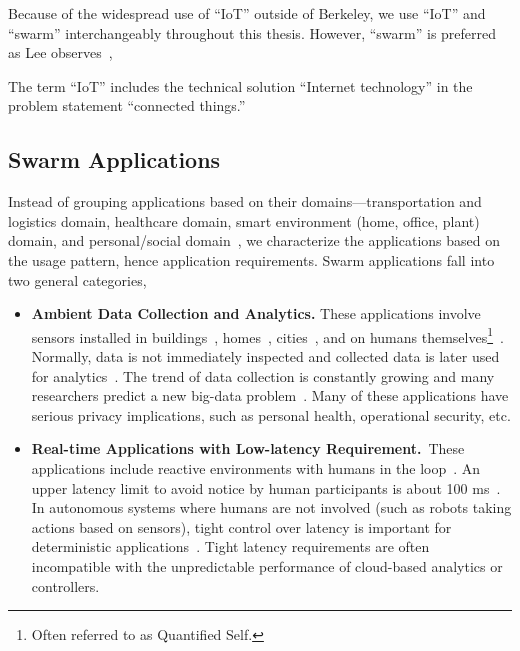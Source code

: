 Because of the widespread use of ``IoT'' outside of Berkeley, we use ``IoT'' and
``swarm'' interchangeably throughout this thesis. However, ``swarm'' is
preferred as Lee observes~\cite{lee2016iot},

\begin{displayquote}
  The term ``IoT'' includes the technical solution ``Internet technology'' in
  the problem statement ``connected things.''
\end{displayquote}

\subsection{Swarm Applications}
\label{sec:swarm-applications}

Instead of grouping applications based on their domains---transportation and
logistics domain, healthcare domain, smart environment (home, office, plant)
domain, and personal/social domain~\cite{atzori2010internet}, we characterize
the applications based on the usage pattern, hence application
requirements. Swarm applications fall into two general categories,

\begin{itemize}[topsep=5pt]

\item \textbf{Ambient Data Collection and Analytics.} These applications involve
  sensors installed in buildings~\cite{dawson2010smap},
  homes~\cite{hnat2011hitchhiker}, cities~\cite{sfpark}, and on humans
  themselves\footnote{Often referred to as Quantified Self.}~\cite{fitbit,
    swan2013quantified}.  Normally, data is not immediately inspected and
  collected data is later used for analytics~\cite{kolter2011redd}.  The trend
  of data collection is constantly growing and many researchers predict a new
  big-data problem~\cite{diaz2012big, zaslavsky2013sensing}.  Many of these
  applications have serious privacy implications, such as personal health,
  operational security, etc.

\item \textbf{Real-time Applications with Low-latency Requirement.}~These
  applications include reactive environments with humans in the
  loop~\cite{cooperstock1997reactive}.
An upper latency limit to avoid notice by human participants is about 100
ms~\cite{nielsen1994usability}.  In autonomous systems where humans are not
involved (such as robots taking actions based on sensors), tight control over
latency is important for deterministic
applications~\cite{eidson2012distributed}.  Tight latency requirements are often
incompatible with the unpredictable performance of cloud-based analytics or
controllers.

\end{itemize}

